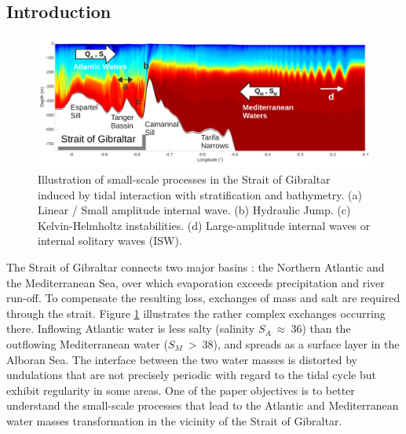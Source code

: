 


\subsection{Introduction}
\begin{figure}[!h]
 \centering
 \includegraphics[width=1\textwidth]{./GBR2D/figure1.png}
 \caption[Illustration of small-scale processes in the Strait of Gibraltar.]{Illustration of small-scale processes in the Strait of Gibraltar induced by tidal interaction with stratification and bathymetry. (a) Linear / Small amplitude internal wave. (b) Hydraulic Jump. (c) Kelvin-Helmholtz instabilities. (d) Large-amplitude internal waves or internal solitary waves (ISW).}
\label{scheme_GBR}
\end{figure}

The Strait of Gibraltar connects two major basins : the Northern Atlantic and the Mediterranean Sea, over which evaporation exceeds precipitation and river run-off. To compensate the resulting loss, exchanges of mass and salt are required through the strait. Figure \ref{scheme_GBR} illustrates the rather complex  exchanges occurring there. %
Inflowing Atlantic water is less salty (salinity $S_A\ \approx\ 36$) than the outflowing Mediterranean water ($S_M\ >\ 38$), and spreads as a surface layer in the Alboran Sea. The interface between the two water masses is distorted by undulations that are not precisely periodic with regard to the tidal cycle but exhibit regularity in some areas.  One of the paper objectives is to better understand the small-scale processes that lead to the Atlantic and Mediterranean water masses transformation in the vicinity of the Strait of Gibraltar.

